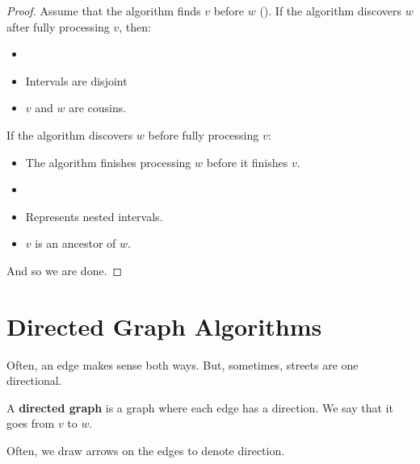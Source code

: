\documentclass[letterpaper]{article}
\begin{document}
\begin{mdframed}[]
    \begin{proof}
        Assume that the algorithm finds $v$ before $w$ (). If the algorithm discovers $w$ after fully processing $v$, then: 
        \begin{itemize}
            \item {}
            \item Intervals are disjoint 
            \item $v$ and $w$ are cousins.
        \end{itemize}
        If the algorithm discovers $w$ before fully processing $v$:
        \begin{itemize}
            \item The algorithm finishes processing $w$ before it finishes $v$.
            \item {}
            \item Represents nested intervals. 
            \item $v$ is an ancestor of $w$. 
        \end{itemize}
        And so we are done.
    \end{proof}
\end{mdframed}






































\newpage 
\section{Directed Graph Algorithms}
Often, an edge makes sense both ways. But, sometimes, streets are one directional.
\begin{definition}{}{}
    A \textbf{directed graph} is a graph where each edge has a direction. We say that it goes from $v$ to $w$. 
\end{definition}
Often, we draw arrows on the edges to denote direction. 
\end{document}
